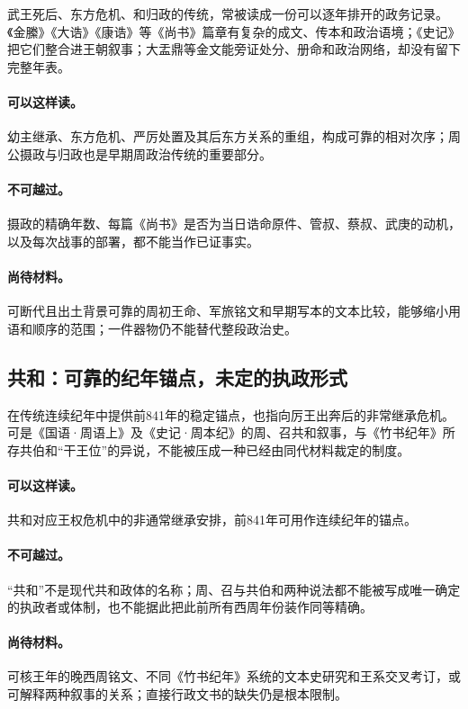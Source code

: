 武王死后、东方危机、和归政的传统，常被读成一份可以逐年排开的政务记录。《金縢》《大诰》《康诰》等《尚书》篇章有复杂的成文、传本和政治语境；《史记》把它们整合进王朝叙事；大盂鼎等金文能旁证处分、册命和政治网络，却没有留下完整年表。

\paragraph{可以这样读。}幼主继承、东方危机、严厉处置及其后东方关系的重组，构成可靠的相对次序；周公摄政与归政也是早期周政治传统的重要部分。

\paragraph{不可越过。}摄政的精确年数、每篇《尚书》是否为当日诰命原件、管叔、蔡叔、武庚的动机，以及每次战事的部署，都不能当作已证事实。

\paragraph{尚待材料。}可断代且出土背景可靠的周初王命、军旅铭文和早期写本的文本比较，能够缩小用语和顺序的范围；一件器物仍不能替代整段政治史。

\subsection{共和：可靠的纪年锚点，未定的执政形式}

在传统连续纪年中提供前841年的稳定锚点，也指向厉王出奔后的非常继承危机。可是《国语·周语上》及《史记·周本纪》的周、召共和叙事，与《竹书纪年》所存共伯和“干王位”的异说，不能被压成一种已经由同代材料裁定的制度。

\paragraph{可以这样读。}共和对应王权危机中的非通常继承安排，前841年可用作连续纪年的锚点。

\paragraph{不可越过。}“共和”不是现代共和政体的名称；周、召与共伯和两种说法都不能被写成唯一确定的执政者或体制，也不能据此把此前所有西周年份装作同等精确。

\paragraph{尚待材料。}可核王年的晚西周铭文、不同《竹书纪年》系统的文本史研究和王系交叉考订，或可解释两种叙事的关系；直接行政文书的缺失仍是根本限制。

